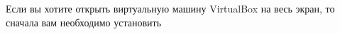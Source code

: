 \documentclass[russian,12pt,a4paper]{article}
\begin{document}
Если вы хотите открыть виртуальную машину VirtualBox на весь экран, то сначала вам необходимо установить 
\end{document}
